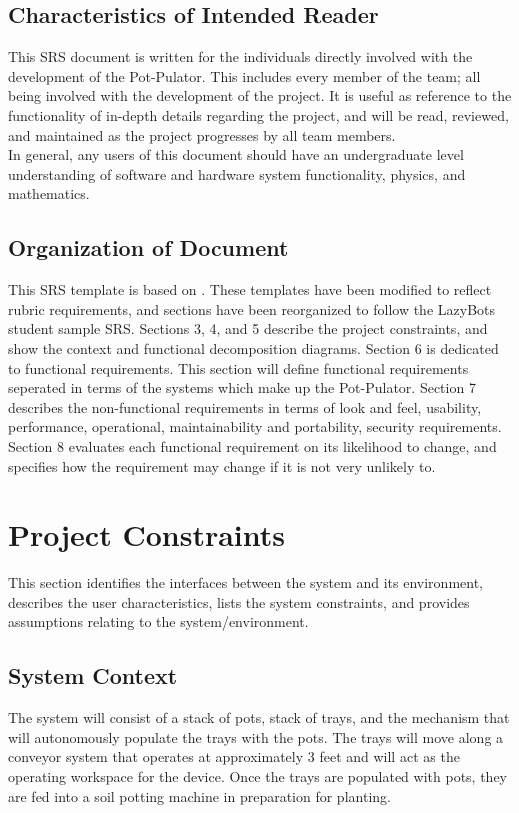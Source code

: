 \documentclass[12pt]{article}
\begin{document}
\subsection{Characteristics of Intended Reader} \label{sec_IntendedReader}

This SRS document is written for the individuals directly involved with the development of the Pot-Pulator. This includes every member of the team; all being involved with the development of the project. It is useful as reference to the functionality of in-depth details regarding the project, and will be read, reviewed, and maintained as the project progresses by all team members. \\

\noindent In general, any users of this document should have an undergraduate level understanding of software and hardware system functionality, physics, and mathematics. \\

\subsection{Organization of Document}

This SRS template is based on \citet{SmithAndLai2005, SmithEtAl2007}. These templates have been modified to reflect rubric requirements, and sections have been reorganized to follow 
the LazyBots student sample SRS. Sections 3, 4, and 5 describe the project constraints, and show the context and functional decomposition diagrams. 
Section 6 is dedicated to functional requirements. This section will define functional requirements seperated in terms of the systems which make up the Pot-Pulator. 
Section 7 describes the non-functional requirements in terms of look and feel, usability, performance, operational, maintainability and portability, security requirements. Section 8
 evaluates each functional requirement on its likelihood to change, and specifies how the requirement may change if it is not very unlikely to.


\section{Project Constraints}

This section identifies the
interfaces between the system and its environment, describes the user
characteristics, lists the system constraints, and provides assumptions relating to the system/environment.

\subsection{System Context}
The system will consist of a stack of pots, stack of trays, and the mechanism that will 
autonomously populate the trays with the pots. The trays will move along a conveyor system that operates at approximately 3 feet 
and will act as the operating workspace for the device. Once the trays are populated with pots,
they are fed into a soil potting machine in preparation for planting.
\end{document}
